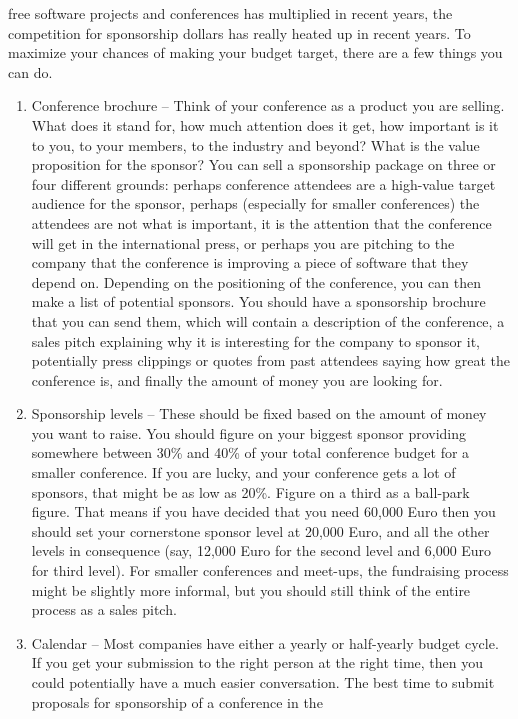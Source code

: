 \begin{itemize}
free software projects and conferences has multiplied in recent years,
the competition for sponsorship dollars has really heated up in recent
years. To maximize your chances of making your budget target, there are
a few things you can do.
 \begin{enumerate}
  \item Conference brochure -- Think of your conference as a product you are
selling. What does it stand for, how much attention does it get, how
important is it to you, to your members, to the industry and beyond?
What is the value proposition for the sponsor?
You can sell a sponsorship package on three or four different grounds:
perhaps conference attendees are a high-value target audience for the
sponsor, perhaps (especially for smaller conferences) the attendees
are not what is important, it is the attention that the conference will get
in the international press, or perhaps you are pitching to the company
that the conference is improving a piece of software that they depend on.
Depending on the positioning of the conference, you can then make a
list of potential sponsors. You should have a sponsorship brochure that
you can send them, which will contain a description of the conference, a
sales pitch explaining why it is interesting for the company to sponsor
it, potentially press clippings or quotes from past attendees saying how
great the conference is, and finally the amount of money you are looking for.
  \item Sponsorship levels -- These should be fixed based on the amount of
money you want to raise. You should figure on your biggest sponsor
providing somewhere between 30\% and 40\% of your total conference budget
for a smaller conference. If you are lucky, and your conference gets a
lot of sponsors, that might be as low as 20\%. Figure on a third as a
ball-park figure. That means if you have decided that you need 60,000 Euro
then you should set your cornerstone sponsor level at 20,000 Euro, and all
the other levels in consequence (say, 12,000 Euro for the second level and
6,000 Euro for third level).
For smaller conferences and meet-ups, the fundraising process might be
slightly more informal, but you should still think of the entire process
as a sales pitch.
  \item Calendar -- Most companies have either a yearly or half-yearly
budget cycle. If you get your submission to the right person at the
right time, then you could potentially have a much easier conversation.
The best time to submit proposals for sponsorship of a conference in the

\end{enumerate}
\end{itemize}
